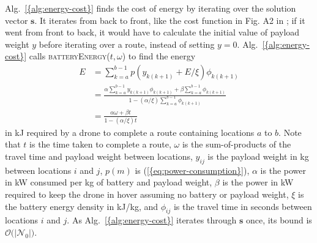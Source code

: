 \documentclass[journal]{IEEEtran}
\begin{document}
{Alg.~\ref{{alg:energy-cost}}} finds the cost of energy by iterating over the solution vector ${\ensuremath{\mathbf{s}}}$. It iterates from back to front, like the cost function in Fig. A2 in \cite{Xiao2012}; if it went from front to back, it would have to calculate the initial value of payload weight ${\ensuremath{y}}$ before iterating over a route, instead of setting ${\ensuremath{y}}=0$. {Alg.~\ref{{alg:energy-cost}}} calls \textsc{batteryEnergy}(${\ensuremath{t}},{\ensuremath{\omega}}$) to find the energy
\begin{equation}
\begin{aligned}
\label{eq:battery-energy}
{\ensuremath{E}} & = \sum_{k=a}^{b-1} {\ensuremath{p({ {\ensuremath{{\ensuremath{y}}_{{k} {(k+1)}}}} + {\ensuremath{E}} / {\ensuremath{\xi}}})}} {\ensuremath{\phi_{{k} {(k+1)}}}} \\
& = \frac{ {\ensuremath{\alpha}} \sum_{k=a}^{b-1} {\ensuremath{{\ensuremath{y}}_{{k} {(k+1)}}}} {\ensuremath{\phi_{{k} {(k+1)}}}} + {\ensuremath{\beta}}  \sum_{k=a}^{b-1} {\ensuremath{\phi_{{k} {(k+1)}}}} }{1 - ({\ensuremath{\alpha}}/{\ensuremath{\xi}}) \sum_{k=a}^{b-1} {\ensuremath{\phi_{{k} {(k+1)}}}} } \\
& = \frac{ {\ensuremath{\alpha}} {\ensuremath{\omega}} + {\ensuremath{\beta}} {\ensuremath{t}} }{ 1 - ({\ensuremath{\alpha}}/{\ensuremath{\xi}}) {\ensuremath{t}} }
\end{aligned}
\end{equation}
in kJ required by a drone to complete a route containing locations $a$ to $b$. Note that ${\ensuremath{t}}$ is the time taken to complete a route, ${\ensuremath{\omega}}$ is the sum-of-products of the travel time and payload weight between locations, ${\ensuremath{{\ensuremath{y}}_{{i} {j}}}}$ is the payload weight in kg between locations $i$ and $j$, ${\ensuremath{p({\ensuremath{m}})}}$ is {(\ref{{eq:power-consumption}})}, ${\ensuremath{\alpha}}$ is the power in kW consumed per kg of battery and payload weight, ${\ensuremath{\beta}}$ is the power in kW required to keep the drone in hover assuming no battery or payload weight, ${\ensuremath{\xi}}$ is the battery energy density in kJ/kg, and ${\ensuremath{\phi_{{i} {j}}}}$ is the travel time in seconds between locations $i$ and $j$. As {Alg.~\ref{{alg:energy-cost}}} iterates through ${\ensuremath{\mathbf{s}}}$ once, its bound is ${\ensuremath{\mathcal{O}\bigl({|{\ensuremath{{\ensuremath{\mathcal{N}}}_{0}}}|}\bigr)}}$.
\end{document}
